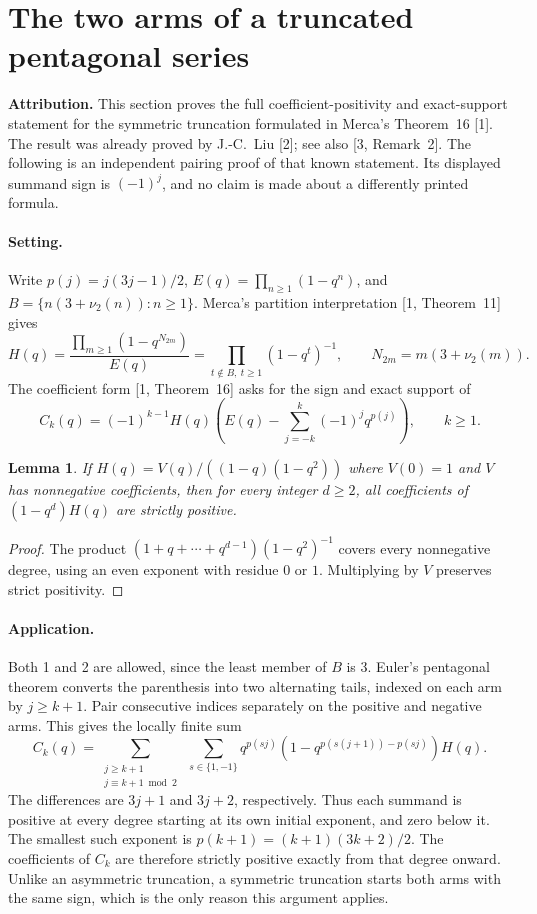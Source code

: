\documentclass[11pt,a4paper]{article}
\numberwithin{equation}{section}
\newtheorem{lemma}[theorem]{Lemma}
\theoremstyle{definition}
\theoremstyle{remark}
\begin{document}
\section{\texorpdfstring{The two arms of a truncated pentagonal series}{The two arms of a truncated pentagonal series}}\label{section:r26showa}
\par\medskip


\noindent\textbf{Attribution.} This section proves the full coefficient-positivity and exact-support statement for the symmetric truncation formulated in Merca's Theorem~16 [1]. The result was already proved by J.-C.~Liu [2]; see also [3, Remark~2]. The following is an independent pairing proof of that known statement. Its displayed summand sign is $(-1)^j$, and no claim is made about a differently printed formula.

\paragraph{Setting.}
Write $p(j)=j(3j-1)/2$, $E(q)=\prod_{n\ge1}(1-q^n)$, and $B=\{n(3+\nu_2(n)):n\ge1\}$.
Merca's partition interpretation [1, Theorem~11] gives
\[
 H(q)=\frac{\prod_{m\ge1}(1-q^{N_{2m}})}{E(q)}
     =\prod_{t\notin B,\ t\ge1}(1-q^t)^{-1},\qquad N_{2m}=m(3+\nu_2(m)).
\]
The coefficient form [1, Theorem~16] asks for the sign and exact support of
\[
 C_k(q)=(-1)^{k-1}H(q)\left(E(q)-\sum_{j=-k}^k(-1)^jq^{p(j)}\right),\qquad k\ge1.
\]
\begin{lemma} If $H(q)=V(q)/((1-q)(1-q^2))$ where $V(0)=1$ and $V$ has nonnegative coefficients, then for every integer $d\ge2$, all coefficients of $(1-q^d)H(q)$ are strictly positive.
\end{lemma}
\begin{proof}
The product $(1+q+\cdots+q^{d-1})(1-q^2)^{-1}$ covers every nonnegative degree, using an even exponent with residue $0$ or $1$. Multiplying by $V$ preserves strict positivity.
\end{proof}
\paragraph{Application.}
Both 1 and 2 are allowed, since the least member of $B$ is 3. Euler's pentagonal theorem converts the parenthesis into two alternating tails, indexed on each arm by $j\ge k+1$. Pair consecutive indices separately on the positive and negative arms. This gives the locally finite sum
\[
 C_k(q)=\sum_{\substack{j\ge k+1\\j\equiv k+1\bmod 2}}\;
 \sum_{s\in\{1,-1\}}q^{p(sj)}(1-q^{p(s(j+1))-p(sj)})H(q).
\]
The differences are $3j+1$ and $3j+2$, respectively. Thus each summand is positive at every degree starting at its own initial exponent, and zero below it. The smallest such exponent is $p(k+1)=(k+1)(3k+2)/2$. The coefficients of $C_k$ are therefore strictly positive exactly from that degree onward. Unlike an asymmetric truncation, a symmetric truncation starts both arms with the same sign, which is the only reason this argument applies.
\end{document}

